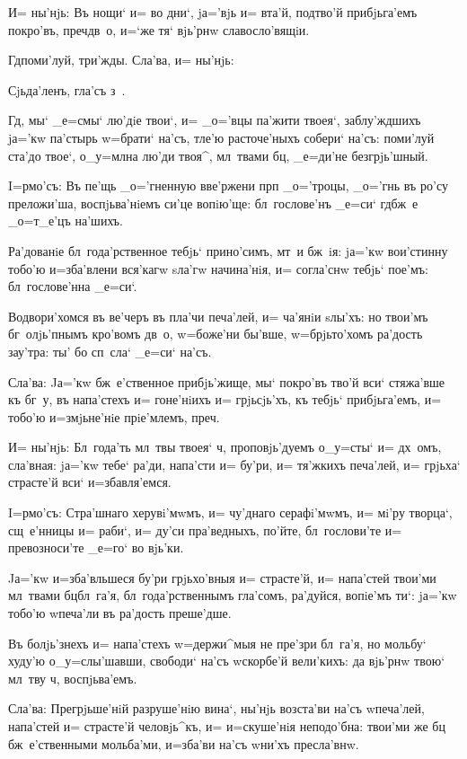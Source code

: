 И= ны'нjь: Въ нощи` и= во дни`, jа='вjь и= вта'й, 
под\ъ тво'й прибjьга'емъ покро'въ, преч дв~о, и=`же 
тя` вjь'рнw славосло'вящiи.

Гд поми'луй, три'жды. Сла'ва, и= ны'нjь:

Сjьда'ленъ, гла'съ з~.

Гд, мы` _е=смы` лю'дiе твои`, и= _о='вцы па'жити 
твоея`, заблу'ждшихъ jа='кw па'стырь w=брати` на'съ, 
тле'ю расточе'ныхъ собери` на'съ: поми'луй ста'до твое`, 
о_у=мл на лю'ди твоя^, мл~твами бц, _е=ди'не 
безгрjь'шный.


I=рмо'съ: Въ пе'щь _о='гненную вве'ржени прп 
_о='троцы, _о='гнь въ ро'су преложи'ша, воспjьва'нiемъ 
си'це вопiю'ще: бл~гослове'нъ _е=си` гд бж~е _о=т_е'цъ 
на'шихъ.

Ра'дованiе бл~года'рственное тебjь` прино'симъ, мт~и 
бж~iя: jа='кw вои'стинну тобо'ю и=зба'влени вся'кагw 
sла'гw начина'нiя, и= согла'снw тебjь` пое'мъ: 
бл~гослове'нна _е=си`.

Водвори'хомся въ ве'черъ въ пла'чи печа'лей, и= 
ча'янiи sлы'хъ: но твои'мъ бг~олjь'пнымъ кро'вомъ дв~о, 
w=боже'ни бы'вше, w=брjьто'хомъ ра'дость зау'тра: ты' бо 
сп~сла` _е=си` на'съ.

Сла'ва: Jа='кw бж~е'ственное прибjь'жище, мы` покро'въ 
тво'й вси` стяжа'вше къ бг~у, въ напа'стехъ и= гоне'нiихъ 
и= грjьсjь'хъ, къ тебjь` прибjьга'емъ, и= тобо'ю 
и=змjьне'нiе прiе'млемъ, преч.

И= ны'нjь: Бл~года'ть мл~твы твоея` ч, 
проповjь'дуемъ о_у=сты` и= дх~омъ, сла'вная: jа='кw тебе` 
ра'ди, напа'сти и= бу'ри, и= тя'жкихъ печа'лей, и= 
грjьха` страсте'й вси` и=збавля'емся.


I=рмо'съ: Стра'шнаго херувi'мwмъ, и= чу'днаго 
серафi'мwмъ, и= мi'ру творца`, сщ~е'нницы и= раби`, и= 
ду'си пра'ведныхъ, по'йте, бл~гослови'те и= превозноси'те 
_е=го` во вjь'ки.

Jа='кw и=зба'вльшеся бу'ри грjьхо'вныя и= страсте'й, 
и= напа'стей твои'ми мл~твами бц бл~га'я, 
бл~года'рственнымъ гла'сомъ, ра'дуйся, вопiе'мъ ти`: 
jа='кw тобо'ю w\т печа'ли въ ра'дость преше'дше.

Въ болjь'знехъ и= напа'стехъ w=держи^мыя не пре'зри 
бл~га'я, но мольбу` худу'ю о_у=слы'шавши, свободи` на'съ 
w\т скорбе'й вели'кихъ: да вjь'рнw твою` мл~тву ч, 
воспjьва'емъ.

Сла'ва: Прегрjьше'нiй разруше'нiю вина`, ны'нjь 
возста'ви на'съ w\т печа'лей, напа'стей и= страсте'й 
человjь^къ, и= и=скуше'нiя неподо'бна: твои'ми же бц 
бж~е'ственными мольба'ми, и=зба'ви на'съ w\т ни'хъ 
пресла'внw.

